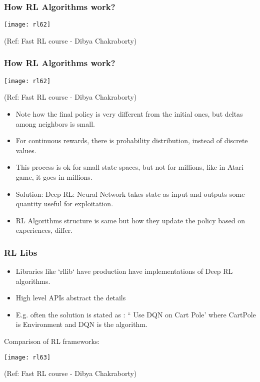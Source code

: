 \begin{frame}[fragile]\frametitle{How RL Algorithms work?}

\begin{center}
\texttt{[image: rl62]}

{\tiny (Ref: Fast RL course - Dibya Chakraborty)}
\end{center}

\end{frame}


\begin{frame}[fragile]\frametitle{How RL Algorithms work?}

\begin{center}
\texttt{[image: rl62]}

{\tiny (Ref: Fast RL course - Dibya Chakraborty)}
\end{center}

\begin{itemize}
\item Note how the final policy is very different from the initial ones, but deltas among neighbors is small.
\item For continuous rewards, there is probability distribution, instead of discrete values.
\item This process is ok for small state spaces, but not for millions, like in Atari game, it goes in millions. 
\item Solution: Deep RL: Neural Network takes state as input and outputs some quantity useful for exploitation.
\item RL Algorithms structure is same but how they update the policy based on experiences, differ.
\end{itemize}
\end{frame}

\begin{frame}[fragile]\frametitle{RL Libs}

\begin{itemize}
\item Libraries like `rllib` have production have implementations of Deep RL algorithms.
\item High level APIs abstract the details
\item E.g. often the solution is stated as : `` Use DQN on Cart Pole' where CartPole is Environment and DQN is the algorithm.
\end{itemize}

Comparison of RL frameworks:

\begin{center}
\texttt{[image: rl63]}

{\tiny (Ref: Fast RL course - Dibya Chakraborty)}
\end{center}

\end{frame}